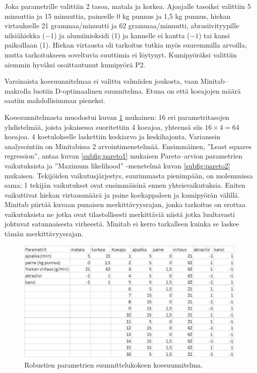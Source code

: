 \documentclass[12pt,a4paper,finnish]{tutthesis}
\begin{document}
Joka parametrille valittiin 2 tasoa, matala ja korkea. Ajoajalle tasoiksi valittiin 5 minuuttia ja 15 minuuttia, paineelle 0 kg punnus ja 1,5 kg punnus, hiekan virtaukselle 21 grammaa/minuutti ja 62 grammaa/minuutti, abrasiivityypille nilsiähiekka ($-1$) ja alumiinioksidi (1) ja kannelle ei kantta ($-1$) tai kansi paikoillaan (1). Hiekan virtausta oli tarkoitus tutkia myös suuremmilla arvoilla, mutta tarkoitukseen soveltuvia suuttimia ei löytynyt. Kumipyöräksi valittiin aiemmin hyväksi osoittautunut kumipyörä P2.

Varsinaista koesuunnitelmaa ei valittu valmiiden joukosta, vaan Minitab–makrolla luotiin D-optimaalinen suunnitelma. Etuna on että koeajojen määrä saatiin mahdollisimman pieneksi.

Koesuunnitelmasta muodostui kuvan \ref{fig:tarray} mukainen:
16 eri parametritasojen yhdistelmää, joista jokaisessa suoritettiin 4 koeajoa, yhteensä siis \(16\times 4 = 64\) koeajoa. 4 koetulokselle laskettiin keskiarvo ja keskihajonta.
Varianssin analysointiin on Minitabissa 2 arvointimenetelmää. Ensimmäinen, ”Least squares regression”, antaa kuvan \ref{subfig:pareto1} mukaisen Pareto–arvion parametrien vaikutuksista
ja ”Maximum likelihood” -menetelmä kuvan \ref{subfig:pareto2} mukaisen.
Tekijöiden vaikutusjärjestys, suurimmasta pienimpään, on molemmissa sama;
1 tekijän vaikutukset ovat ensimmäisinä ennen yhteisvaikutuksia.
Eniten vaikuttivat hiekan virtausmäärä ja paine koekappaleen ja kumipyörän välillä.
Minitab piirtää kuvaan punaisen merkittävyysrajan, jonka tarkoitus on erottaa vaikutuksista ne
jotka ovat tilastollisesti merkittäviä niistä jotka luultavasti johtuvat satunnaisesta virheestä.
Minitab ei kerro tarkalleen kuinka se laskee tämän merkittävyysrajan.

\begin{figure}
  \begin{center}
    \includegraphics[width=1.0\textwidth]{tarray}
  \end{center}
  \caption[Robustien parametrien koesuunnitelma]{Robustien parametrien suunnittelukokeen koesuunnitelma.}
  \label{fig:tarray}
\end{figure}
\end{document}
